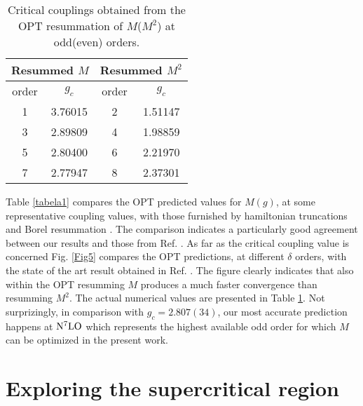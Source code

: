 \documentclass[a4paper,11pt]{article}
\begin{document}
    
    
    

\begin{table}[ht!]
    \centering
    \begin{tabular}{ |c|c||c|c| }
        \hline
        \multicolumn{2}{|c||}{Resummed $M$}&
        \multicolumn{2}{|c|}{Resummed $M^2$} \\
        \hline
        \hline
        order & $g_c$ & order & $g_c$\\
        \hline
        1 & 3.76015 & 2 & 1.51147  \\ 
        3 & 2.89809 & 4 & 1.98859  \\
        5 & 2.80400 & 6 & 2.21970  \\
        7 & 2.77947 & 8 & 2.37301 \\
        \hline
    \end{tabular}
    \caption{Critical couplings obtained from the OPT resummation of $M$($M^2$) at odd(even) orders.}
\label{tabela2}    
\end{table}
 
Table \ref{tabela1} compares the OPT predicted values for $M(g)$, at some representative coupling values,  with those furnished by hamiltonian truncations   \cite {hamilton6,hamilton7} and Borel resummation  \cite{serone1}. The comparison indicates a  particularly good agreement between our results and those from Ref. \cite{serone1}.
As far as the critical coupling value is concerned  Fig. \ref {Fig5} compares the OPT predictions, at different $\delta$ orders, with the state of the art result obtained in Ref. \cite {serone1}. The figure clearly indicates that also within the OPT  resumming $M$ produces a much faster  convergence than  resumming $M^2$. The actual numerical values are presented in Table \ref{tabela2}. Not surprizingly, in comparison with $g_c = 2.807(34)$,  our most accurate  prediction happens at ${\rm N}^7{\rm LO}$ which represents the highest available odd order for which  $M$ can be optimized in the present work.  






\section{Exploring the supercritical  region}
\end{document}
